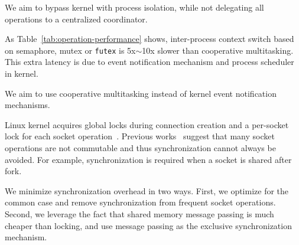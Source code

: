 We aim to bypass kernel with process isolation, while not delegating all operations to a centralized coordinator.


As Table~\ref{tab:operation-performance} shows, inter-process context switch based on semaphore, mutex or \texttt{futex} is 5x$\sim$10x slower than cooperative multitasking. This extra latency is due to event notification mechanism and process scheduler in kernel. %

We aim to use cooperative multitasking instead of kernel event notification mechanisms.

Linux kernel acquires global locks during connection creation and a per-socket lock for each socket operation~\cite{boyd2010analysis,han2012megapipe,lin2016scalable}. Previous works~\cite{boyd2010analysis,clements2015scalable} suggest that many socket operations are not commutable and thus synchronization cannot always be avoided. For example, synchronization is required when a socket is shared after fork.

We minimize synchronization overhead in two ways. First, we optimize for the common case and remove synchronization from frequent socket operations. Second, we leverage the fact that shared memory message passing is much cheaper than locking, and use message passing as the exclusive synchronization mechanism.



